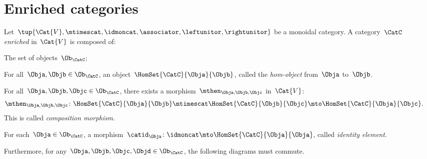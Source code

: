 

\section{Enriched categories}
\label{sec:enrichment-enriched-categories}

\begin{ctdefinition}
    \label{def:enriched_cat}
    Let~$\tup{\Cat{V},\mtimescat, \idmoncat, \associator, \leftunitor,\rightunitor}$ be a monoidal category.
    A category~$\CatC$ \emph{enriched} in~$\Cat{V}$ is composed of:
    \begin{compactenum}
        \item The set of objects~$\Ob_\CatC$;
        \item For all~$\Obja,\Objb\in \Ob_\CatC$, an object~$\HomSet{\CatC}{\Obja}{\Objb}$, called the \emph{hom-object} from~$\Obja$ to~$\Objb$.
        \item For all~$\Obja, \Objb, \Objc\in \Ob_\CatC$, there exists a morphism~$\mthen_{\Obja,\Objb,\Objc}$ in~$\Cat{V}$:
        \begin{equation}
            \mthen_{\Obja,\Objb,\Objc}\colon \HomSet{\CatC}{\Obja}{\Objb}\mtimescat \HomSet{\CatC}{\Objb}{\Objc}\mto \HomSet{\CatC}{\Obja}{\Objc}.
        \end{equation}
        This is called \emph{composition morphism}.
        \item For each~$\Obja\in \Ob_\CatC$, a morphism~$\catid_\Obja\colon \idmoncat \mto \HomSet{\CatC}{\Obja}{\Obja}$, called \emph{identity element}.
    \end{compactenum}
    Furthermore, for any~$\Obja,\Objb,\Objc,\Objd\in \Ob_\CatC$, the following diagrams must commute.
\end{ctdefinition}

\begin{widepar}
    \begin{center}
    \end{center}

    \begin{center}
    \end{center}
\end{widepar}

